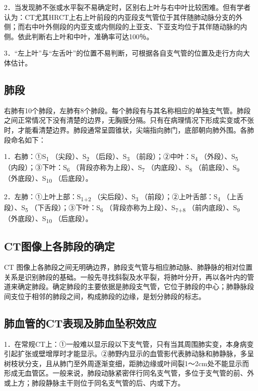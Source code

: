 2．当发现肺不张或水平裂不易确定时，区别右上叶与右中叶比较困难。但有学者认为：CT尤其HRCT上右上叶前段的内亚段支气管位于其伴随肺动脉分支的外侧；而右中叶外侧段的内亚支或内侧段的上亚支、下亚支均位于其伴随动脉的内侧。依此判断右上叶和中叶，准确率可达100％。

3．“左上叶”与“左舌叶”的位置不易判断，可根据各自支气管的位置及走行方向大体估计。

\subsection{肺段}

右肺有10个肺段，左肺有8个肺段。每个肺段有与其名称相应的单独支气管。肺段之间正常情况下没有清楚的边界，无胸膜分隔。只有在病理情况下形成实变或不张时，才能看清楚边界。肺段通常呈圆锥状，尖端指向肺门，底部朝向肺外围。各肺段命名如下：

1．右肺：①S\textsubscript{1} （尖段）、S\textsubscript{2}
（后段）、S\textsubscript{3} （前段）；②中叶：S\textsubscript{4}
（外段）、S\textsubscript{5} （内段）；③下叶：S\textsubscript{6}
（背段亦称为上段）、S\textsubscript{7} （内底段）、S\textsubscript{8}
（前底段）、S\textsubscript{9} （外底段）、S\textsubscript{10}
（后底段）。

2．左肺：①上叶上部：S\textsubscript{1+2} （尖后段）、S\textsubscript{3}
（前段）；②上叶舌部：S\textsubscript{4} （上舌段）、S\textsubscript{5}
（下舌段）；③下叶：S\textsubscript{6}
（背段亦称为上段）、S\textsubscript{7+8}
（前内底段）、S\textsubscript{9} （外底段）、S\textsubscript{10}
（后底段）。

\subsection{CT图像上各肺段的确定}

CT
图像上各肺段之间无明确边界，肺段支气管与相应肺动脉、肺静脉的相对位置关系是识别肺段的基础。一般先寻找斜裂及水平裂，将肺叶分开，再以各叶内的管道来确定肺段。确定肺段的主要依据是肺段支气管，它位于肺段的中心；肺静脉段间支位于相邻的肺段之间，构成肺段的边缘，是划分肺段的标志。

\subsection{肺血管的CT表现及肺血坠积效应}

1．在常规CT上：①一般难以显示段以下支气管，只有当其周围肺实变，本身病变引起扩张或壁增厚时才能显示。②肺野内显示的血管影代表肺动脉和肺静脉，多呈树枝状分支，且从肺门至外周逐渐变细，距肺边缘或叶间裂1～2cm处不能显示而形成无血管区。一般来说，肺段动脉紧密伴行同名支气管，多位于支气管的前、外或上方；肺段静脉主干则位于同名支气管的后、内或下方。

